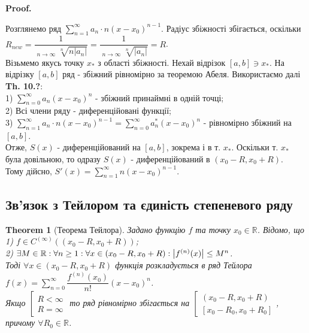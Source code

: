 \documentclass[a4paper, 10pt]{article}
\makeatletter
\DeclareMathOperator*\uplim{\overline{lim}}
\def\huge{\displaystyle}
\def\qed{$\blacksquare$}
\theoremstyle{theoremdd}
\newtheorem{theorem}{Theorem}[subsection]
\theoremstyle{theoremdd}
\theoremstyle{theoremdd}
\theoremstyle{theoremdd}
\theoremstyle{theoremdd}
\theoremstyle{theoremdd}
\theoremstyle{theoremdd}
\theoremstyle{theoremdd}
\renewenvironment{proof}[1][Proof.\\]{\par
\pushQED{\hfill \qed}%
\normalfont \topsep6\p@\@plus6\p@\relax
\trivlist
\item\relax
{\bfseries
#1\@addpunct{.}}\hspace\labelsep\ignorespaces
}{%
\popQED\endtrivlist\@endpefalse
}
\makeatother
\begin{document}
\begin{proof}
Розглянемо ряд $\huge \sum_{n=1}^\infty a_n\cdot n(x-x_0)^{n-1}$. Радіус збіжності збігається, оскільки\\
$ R_{new} = \dfrac{1}{\huge \uplim_{n \to \infty} \sqrt[n]{n |a_n|}} = \dfrac{1}{\huge \uplim_{n \to \infty} \sqrt[n]{|a_n|}} = R$.\\
Візьмемо якусь точку $x_*$ з області збіжності. Нехай відрізок $[a,b] \ni x_*$. На відрізку $[a,b]$ ряд - збіжний рівномірно за теоремою Абеля. Використаємо далі \textbf{Th. 10.?}:\\
1) $\huge \sum_{n=0}^\infty a_n(x-x_0)^n$ - збіжний принаймні в одній точці;\\
2) Всі члени ряду - диференційовані функції;\\
3) $\huge \sum_{n=1}^\infty a_n \cdot n(x-x_0)^{n-1} = \huge\sum_{n=0}^\infty a_n^* (x-x_0)^n$ - рівномірно збіжний на $[a,b]$.\\
Отже, $S(x)$ - диференційований на $[a,b]$, зокрема і в т. $x_*$. Оскільки т. $x_*$ була довільною, то одразу $S(x)$ - диференційований в $(x_0-R,x_0+R)$.\\
Тому дійсно, $S'(x) = \huge \sum_{n=1}^\infty n(x-x_0)^{n-1}$.
\end{proof}

\subsection{Зв'язок з Тейлором та єдиність степеневого ряду}
\begin{theorem}[Теорема Тейлора]
Задано функцію $f$ та точку $x_0 \in \mathbb{R}$. Відомо, що\\
1) $f \in C^{(\infty)}((x_0-R,x_0+R))$;\\
2) $\exists M \in \mathbb{R}: \forall n \geq 1: \forall x \in (x_0-R, x_0+R): \abs{f^{(n)}(x)} \leq M^n$.\\
Тоді $\forall x \in (x_0-R, x_0+R)$ функція розкладується в ряд Тейлора $f(x) = \huge \sum_{n=0}^\infty \dfrac{f^{(n)}(x_0)}{n!}(x-x_0)^n$.\\
Якщо $\left[ \begin{gathered} R < \infty \\ R = \infty \end{gathered} \right.$ то ряд рівномірно збігається на $\left[ \begin{gathered} (x_0-R,x_0+R) \\ [x_0-R_0,x_0+R_0] \end{gathered} \right.$, причому $\forall R_0 \in \mathbb{R}$.
\end{theorem}
\end{document}

